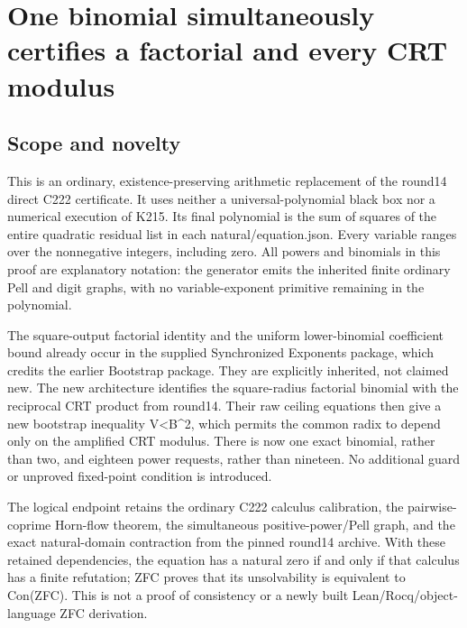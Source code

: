 \section{One binomial simultaneously certifies a factorial and every CRT modulus}



\subsection*{Scope and novelty}



This is an ordinary, existence-preserving arithmetic replacement of the round14 direct C222 certificate. It uses neither a universal-polynomial black box nor a numerical execution of K215. Its final polynomial is the sum of squares of the entire quadratic residual list in each natural/\allowbreak{}equation.json. Every variable ranges over the nonnegative integers, including zero. All powers and binomials in this proof are explanatory notation: the generator emits the inherited finite ordinary Pell and digit graphs, with no variable-exponent primitive remaining in the polynomial.



The square-output factorial identity and the uniform lower-binomial coefficient bound already occur in the supplied Synchronized Exponents package, which credits the earlier Bootstrap package. They are explicitly inherited, not claimed new. The new architecture identifies the square-radius factorial binomial with the reciprocal CRT product from round14. Their raw ceiling equations then give a new bootstrap inequality V\textless{}\allowbreak{}B\textasciicircum{}\allowbreak{}2, which permits the common radix to depend only on the amplified CRT modulus. There is now one exact binomial, rather than two, and eighteen power requests, rather than nineteen. No additional guard or unproved fixed-point condition is introduced.



The logical endpoint retains the ordinary C222 calculus calibration, the pairwise-coprime Horn-flow theorem, the simultaneous positive-power/\allowbreak{}Pell graph, and the exact natural-domain contraction from the pinned round14 archive. With these retained dependencies, the equation has a natural zero if and only if that calculus has a finite refutation; ZFC proves that its unsolvability is equivalent to Con(ZFC). This is not a proof of consistency or a newly built Lean/\allowbreak{}Rocq/\allowbreak{}object-language ZFC derivation.



